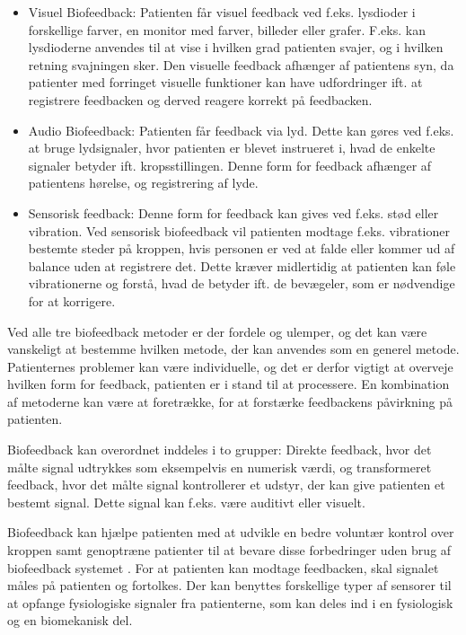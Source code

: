 \begin{itemize}
\item Visuel Biofeedback: Patienten får visuel feedback ved f.eks. lysdioder i forskellige farver, en monitor med farver, billeder eller grafer. F.eks. kan lysdioderne anvendes til at vise i hvilken grad patienten svajer, og i hvilken retning svajningen sker.
Den visuelle feedback afhænger af patientens syn, da patienter med forringet visuelle funktioner kan have udfordringer ift. at registrere feedbacken og derved reagere korrekt på feedbacken.  \cite{webster2009,Blanchard1972}  

\item Audio Biofeedback: Patienten får feedback via lyd. Dette kan gøres ved f.eks. at bruge lydsignaler, hvor patienten er blevet instrueret i, hvad de enkelte signaler betyder ift. kropsstillingen. Denne form for feedback afhænger af patientens hørelse, og registrering af lyde. \cite{webster2009,Blanchard1972} %

\item Sensorisk feedback: Denne form for feedback kan gives ved f.eks. stød eller vibration. Ved sensorisk biofeedback vil patienten modtage f.eks. vibrationer bestemte steder på kroppen, hvis personen er ved at falde eller kommer ud af balance uden at registrere det. Dette kræver midlertidig at patienten kan føle vibrationerne og forstå, hvad de betyder ift. de bevægeler, som er nødvendige for at korrigere. \cite{Blanchard1972}           
\end{itemize}
 
Ved alle tre biofeedback metoder er der fordele og ulemper, og det kan være vanskeligt at bestemme hvilken metode, der kan anvendes som en generel metode. Patienternes problemer kan være individuelle, og det er derfor vigtigt at overveje hvilken form for feedback, patienten er i stand til at processere. En kombination af metoderne kan være at foretrække, for at forstærke feedbackens påvirkning på patienten. 

Biofeedback kan overordnet inddeles i to grupper: Direkte feedback, hvor det målte signal udtrykkes som eksempelvis en numerisk værdi, og transformeret feedback, hvor det målte signal kontrollerer et udstyr, der kan give patienten et bestemt signal. Dette signal kan f.eks. være auditivt eller visuelt. \cite{Giggins2013} 

Biofeedback kan hjælpe patienten med at udvikle en bedre voluntær kontrol over kroppen samt genoptræne patienter til at bevare disse forbedringer uden brug af biofeedback systemet \cite{Prentice2007}.  For at patienten kan modtage feedbacken, skal signalet måles på patienten og fortolkes. Der kan benyttes forskellige typer af sensorer til at opfange fysiologiske signaler fra patienterne, som kan deles ind i en fysiologisk og en biomekanisk del. \cite{Giggins2013}

